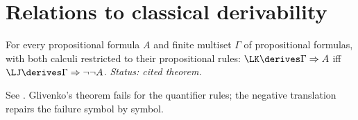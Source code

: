 \section{Relations to classical derivability}
\label{sec:intuitionistic-classical}

\begin{theorem}[Glivenko]
\label{thm:glivenko}
For every propositional formula \(A\) and finite multiset \(\Gamma\) of
propositional formulas, with both calculi restricted to their propositional
rules:
\(\LK\derives\Gamma\Rightarrow A\) iff
\(\LJ\derives\Gamma\Rightarrow\neg\neg A\).
\textit{Status: cited theorem.}
\end{theorem}

See \cite{TroelstraVanDalen1988,TroelstraSchwichtenberg2000}.  Glivenko's
theorem fails for the quantifier rules; the negative translation repairs
the failure symbol by symbol.

